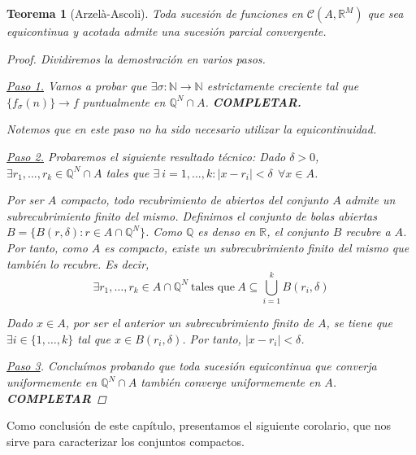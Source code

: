\documentclass[11pt, a4paper]{article}
\theoremstyle{theorem-style}
\newtheorem{nth}{Teorema}[section]
\theoremstyle{definition-style}
\theoremstyle{remark-style}
\theoremstyle{example-style}
\begin{document}
\begin{nth}[Arzelà-Ascoli] Toda sucesión de funciones en $\mathcal{C}(A,\mathbb{R}^M)$ que sea equicontinua y acotada admite una sucesión parcial convergente.


\begin{proof} Dividiremos la demostración en varios pasos.

\underline{Paso 1.} Vamos a probar que $\exists \sigma : \mathbb{N} \to \mathbb{N}$ estrictamente creciente tal que $\{f_\sigma(n)\} \to f$ puntualmente en $\mathbb{Q}^N\cap A$.  \textbf{COMPLETAR.}

Notemos que en este paso no ha sido necesario utilizar la equicontinuidad.

\underline{Paso 2.} Probaremos el siguiente resultado técnico: Dado $\delta>0$, $\exists r_1,...,r_k \in \mathbb Q^N \cap A$ tales que $\exists \ i=1,...,k : |x-r_i| < \delta \ \ \forall x \in A$.

Por ser $A$ compacto, todo recubrimiento de abiertos del conjunto $A$ admite un subrecubrimiento finito del mismo. Definimos el conjunto de bolas abiertas $B=\{B(r,\delta) : r \in A\cap \mathbb Q^N \}$. Como $\mathbb{Q}$ es denso en $\mathbb{R}$, el conjunto $B$ recubre a $A$. Por tanto, como $A$ es compacto, existe un subrecubrimiento finito del mismo que también lo recubre. Es decir, $$\exists r_1,\dots, r_k \in A\cap \mathbb Q^N \ \text{tales que} \ A \subseteq \bigcup_{i=1}^k B(r_i,\delta)$$
 
Dado $x \in A$, por ser el anterior un subrecubrimiento finito de $A$, se tiene que\\ $\exists i \in \{1,\dots,k\}$ tal que $x \in B(r_i,\delta)$. Por tanto, $|x-r_i| <\delta$.

\underline{Paso 3}. Concluímos probando que toda sucesión equicontinua que converja uniformemente en $\mathbb{Q}^N\cap A$ también converge uniformemente en $A$. \textbf{COMPLETAR}
\end{proof}
	
\end{nth}

Como conclusión de este capítulo, presentamos el siguiente corolario, que nos sirve para caracterizar los conjuntos compactos.
\end{document}
